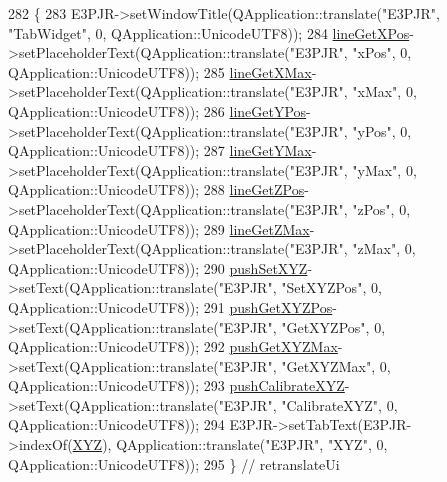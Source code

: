 \begin{DoxyCode}
282     \{
283         E3PJR->setWindowTitle(QApplication::translate(\textcolor{stringliteral}{"E3PJR"}, \textcolor{stringliteral}{"TabWidget"}, 0, QApplication::UnicodeUTF8));
284         \hyperlink{class_ui___e3_p_j_r_a2aa996a4bf178178f8c776bd139e1e98}{lineGetXPos}->setPlaceholderText(QApplication::translate(\textcolor{stringliteral}{"E3PJR"}, \textcolor{stringliteral}{"xPos"}, 0, 
      QApplication::UnicodeUTF8));
285         \hyperlink{class_ui___e3_p_j_r_aa70a702ff832048eb7b3a06560b1cccd}{lineGetXMax}->setPlaceholderText(QApplication::translate(\textcolor{stringliteral}{"E3PJR"}, \textcolor{stringliteral}{"xMax"}, 0, 
      QApplication::UnicodeUTF8));
286         \hyperlink{class_ui___e3_p_j_r_af7a504d650e35e560d66d6e9cc2ec20e}{lineGetYPos}->setPlaceholderText(QApplication::translate(\textcolor{stringliteral}{"E3PJR"}, \textcolor{stringliteral}{"yPos"}, 0, 
      QApplication::UnicodeUTF8));
287         \hyperlink{class_ui___e3_p_j_r_a6db76c359ac491d1e084a0febda62fa8}{lineGetYMax}->setPlaceholderText(QApplication::translate(\textcolor{stringliteral}{"E3PJR"}, \textcolor{stringliteral}{"yMax"}, 0, 
      QApplication::UnicodeUTF8));
288         \hyperlink{class_ui___e3_p_j_r_af271cd40f5223cbdb1803e41493746cc}{lineGetZPos}->setPlaceholderText(QApplication::translate(\textcolor{stringliteral}{"E3PJR"}, \textcolor{stringliteral}{"zPos"}, 0, 
      QApplication::UnicodeUTF8));
289         \hyperlink{class_ui___e3_p_j_r_a4bd5e082a2fb51522d5606ed355289d5}{lineGetZMax}->setPlaceholderText(QApplication::translate(\textcolor{stringliteral}{"E3PJR"}, \textcolor{stringliteral}{"zMax"}, 0, 
      QApplication::UnicodeUTF8));
290         \hyperlink{class_ui___e3_p_j_r_a95989982eaebbf117db602b9c5642fc5}{pushSetXYZ}->setText(QApplication::translate(\textcolor{stringliteral}{"E3PJR"}, \textcolor{stringliteral}{"SetXYZPos"}, 0, 
      QApplication::UnicodeUTF8));
291         \hyperlink{class_ui___e3_p_j_r_a5a172ff2cdd7f0b1731e866267981cd4}{pushGetXYZPos}->setText(QApplication::translate(\textcolor{stringliteral}{"E3PJR"}, \textcolor{stringliteral}{"GetXYZPos"}, 0, 
      QApplication::UnicodeUTF8));
292         \hyperlink{class_ui___e3_p_j_r_a16f1701307e43c614a3c0aed623577b7}{pushGetXYZMax}->setText(QApplication::translate(\textcolor{stringliteral}{"E3PJR"}, \textcolor{stringliteral}{"GetXYZMax"}, 0, 
      QApplication::UnicodeUTF8));
293         \hyperlink{class_ui___e3_p_j_r_a0a82bc71b94b2c607f872cbcf936811a}{pushCalibrateXYZ}->setText(QApplication::translate(\textcolor{stringliteral}{"E3PJR"}, \textcolor{stringliteral}{"CalibrateXYZ"}, 0, 
      QApplication::UnicodeUTF8));
294         E3PJR->setTabText(E3PJR->indexOf(\hyperlink{class_ui___e3_p_j_r_a098a80b873d9e0a09fd834f09e5028b4}{XYZ}), QApplication::translate(\textcolor{stringliteral}{"E3PJR"}, \textcolor{stringliteral}{"XYZ"}, 0, 
      QApplication::UnicodeUTF8));
295     \} \textcolor{comment}{// retranslateUi}
\end{DoxyCode}


